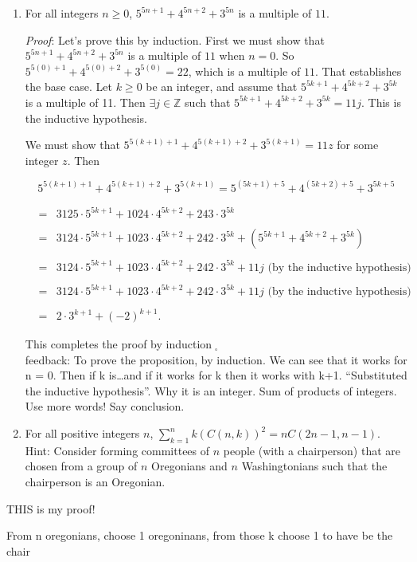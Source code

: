 \documentclass[12pt]{amsart}
\theoremstyle{definition}
\theoremstyle{remark}
\newcommand{\ints}{\mathbb Z}
\begin{document}
\begin{enumerate}
\newpage


\item For all integers $n\geq 0$, $5^{5n+1}+4^{5n+2}+3^{5n}$ is a multiple of $11$.


\bigskip
\bigskip

\emph{Proof}: Let's prove this by induction. First we must show that $5^{5n+1}+4^{5n+2}+3^{5n}$ is a multiple of $11$ when $n=0$.
So $5^{5(0)+1}+4^{5(0)+2}+3^{5(0)}=22$, which is a multiple of $11$. That establishes the base case.
Let $k\geq 0$ be an integer, and assume that $5^{5k+1}+4^{5k+2}+3^{5k}$ is a multiple of 11. 
Then $\exists j\in\ints$ such that $5^{5k+1}+4^{5k+2}+3^{5k}=11j$. This is the inductive hypothesis.

We must show that $5^{5(k+1)+1}+4^{5(k+1)+2}+3^{5(k+1)}=11z$ for some integer $z$. Then

$$5^{5(k+1)+1}+4^{5(k+1)+2}+3^{5(k+1)} = 5^{(5k+1)+5}+4^{(5k+2)+5}+3^{5k+5}$$

\begin{eqnarray*}
    &=& 3125\cdot 5^{5k+1}+1024\cdot 4^{5k+2}+243\cdot 3^{5k} \\
    \\
    &=& 3124\cdot 5^{5k+1}+1023\cdot 4^{5k+2}+242\cdot 3^{5k}+(5^{5k+1}+4^{5k+2}+3^{5k}) \\
    \\
    &=& 3124\cdot 5^{5k+1}+1023\cdot 4^{5k+2}+242\cdot 3^{5k}+11j \mbox{ (by the inductive hypothesis)} \\
    \\
    &=& 3124\cdot 5^{5k+1}+1023\cdot 4^{5k+2}+242\cdot 3^{5k}+11j \mbox{ (by the inductive hypothesis)} \\
    \\
    &=& 2\cdot 3^{k+1}+(-2)^{k+1}.
\end{eqnarray*}
    
This completes the proof by induction$\;_{\square}$\\


feedback:
To prove the proposition, by induction. We can see that it works for n = 0. 
Then if k is…and if it works for k then it works with k+1. 
“Substituted the inductive hypothesis”. Why it is an integer. Sum of products of integers. Use more words! Say conclusion.


\newpage

\item For all positive integers $n$, $\displaystyle \sum_{k=1}^n k(C(n,k))^2=n C(2n-1,n-1)$.\\

Hint:  Consider forming committees of $n$ people (with a chairperson) that are chosen from a group of $n$ Oregonians and $n$ Washingtonians such that the chairperson is an Oregonian.

\end{enumerate}

\bigskip
\bigskip

THIS is my proof!


From n oregonians, choose 1 oregoninans, from those k choose 1 to have be the chair
\end{document}
